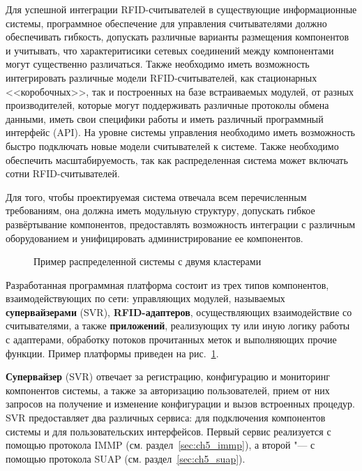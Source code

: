 Для успешной интеграции RFID-считывателей в существующие информационные системы, программное обеспечение для управления считывателями должно обеспечивать гибкость, допускать различные варианты размещения компонентов и учитывать, что характеритисики сетевых соединений между компонентами могут существенно различаться. Также необходимо иметь возможность интегрировать различные модели RFID-считывателей, как стационарных <<коробочных>>, так и построенных на базе встраиваемых модулей, от разных производителей, которые могут поддерживать различные протоколы обмена данными, иметь свои специфики работы и иметь различный программный интерфейс (API). На уровне системы управления необходимо иметь возможность быстро подключать новые модели считывателей к системе. Также необходимо обеспечить масштабируемость, так как распределенная система может включать сотни RFID-считывателей.

Для того, чтобы проектируемая система отвечала всем перечисленным требованиям, она должна иметь модульную структуру, допускать гибкое развёртывание компонентов, предоставлять возможность интеграции с различным оборудованием и унифицировать администрирование ее компонентов.

\begin{figure}[ht]
  \caption{Пример распределенной системы с двумя кластерами}
  \label{fig:ch5_system_example}
\end{figure}

Разработанная программная платформа состоит из трех типов компонентов, взаимодействующих по сети: управляющих модулей, называемых \textbf{супервайзерами} (SVR), \textbf{RFID-адаптеров}, осуществляющих взаимодействие со считывателями, а также \textbf{приложений}, реализующих ту или иную логику работы с адаптерами, обработку потоков прочитанных меток и выполняющих прочие функции. Пример платформы приведен на рис.~\ref{fig:ch5_system_example}.

\textbf{Супервайзер} (SVR) отвечает за регистрацию, конфигурацию и мониторинг компонентов системы, а также за авторизацию пользователей, прием от них запросов на получение и изменение конфигурации и вызов встроенных процедур. SVR предоставляет два различных сервиса: для подключения компонентов системы и для пользовательских интерфейсов. Первый сервис реализуется с помощью протокола IMMP (см. раздел~\ref{sec:ch5_immp}), а второй "--- с помощью протокола SUAP (см. раздел~\ref{sec:ch5_suap}).

